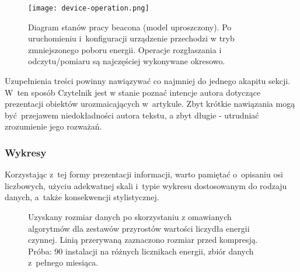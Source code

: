 \begin{figure}
	\begin{center}
		\vspace{-5mm}
		\texttt{[image: device-operation.png]}
		\caption{
			Diagram stanów pracy beacona (model uproszczony). Po uruchomieniu i~konfiguracji urządzenie przechodzi w tryb zmniejszonego poboru energii. Operacje rozgłaszania i odczytu/pomiaru są najczęściej wykonywane okresowo.
		}
		\label{fig:devop}
		\vspace{-8mm}
	\end{center}
\end{figure}

\noindent Uzupełnienia treści powinny nawiązywać co najmniej do jednego akapitu sekcji. W~ten sposób Czytelnik jest w stanie poznać intencje autora dotyczące prezentacji obiektów urozmaicających w~artykule. Zbyt krótkie nawiązania mogą być przejawem niedokładności autora tekstu, a zbyt długie - utrudniać zrozumienie jego rozważań.

\subsubsection{Wykresy}
\label{subsubsec:charts}

Korzystając z~tej formy prezentacji informacji, warto pamiętać o~opisaniu osi liczbowych, użyciu adekwatnej skali i~typie wykresu dostosowanym do rodzaju danych, a~także konsekwencji stylistycznej.

\begin{figure}[!h]
	\vspace{-3mm}
	\centering
	\caption{
		Uzyskany rozmiar danych po skorzystaniu z omawianych algorytmów dla zestawów przyrostów wartości liczydła energii czynnej. Linią przerywaną zaznaczono rozmiar przed kompresją. Próba: 90 instalacji na różnych licznikach energii, zbiór danych z~pełnego miesiąca.
	}
	\vspace{-6mm}
	\label{fig:compressionAlgorithms}
\end{figure}

